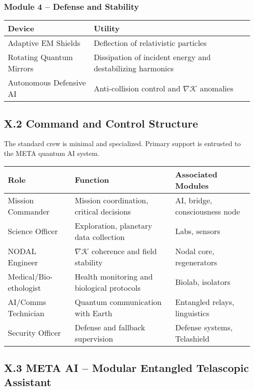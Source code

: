 \documentclass[12pt]{article}
\begin{document}
\vspace{0.4cm}

\subsubsection*{Module 4 – Defense and Stability}
\begin{tabular}{ll}
\toprule
\textbf{Device} & \textbf{Utility} \\
\midrule
Adaptive EM Shields & Deflection of relativistic particles \\
Rotating Quantum Mirrors & Dissipation of incident energy and destabilizing harmonics \\
Autonomous Defensive AI & Anti-collision control and $\nabla \mathcal{K}$ anomalies \\
\bottomrule
\end{tabular}

\vspace{0.6cm}

\subsection*{X.2 Command and Control Structure}

The standard crew is minimal and specialized. Primary support is entrusted to the META quantum AI system.

\begin{tabular}{lll}
\toprule
\textbf{Role} & \textbf{Function} & \textbf{Associated Modules} \\
\midrule
Mission Commander & Mission coordination, critical decisions & AI, bridge, consciousness node \\
Science Officer & Exploration, planetary data collection & Labs, sensors \\
NODAL Engineer & $\nabla \mathcal{K}$ coherence and field stability & Nodal core, regenerators \\
Medical/Bio-ethologist & Health monitoring and biological protocols & Biolab, isolators \\
AI/Comms Technician & Quantum communication with Earth & Entangled relays, linguistics \\
Security Officer & Defense and fallback supervision & Defense systems, Telashield \\
\bottomrule
\end{tabular}

\vspace{0.6cm}

\subsection*{X.3 META AI – Modular Entangled Telascopic Assistant}
\end{document}
